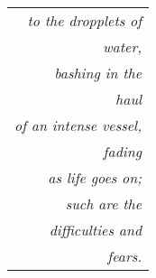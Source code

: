 
\cleardoublepage


\thispagestyle{empty}
\begin{flushright}

\begin{minipage}{9cm}
\vspace{2.5cm}
\hfill%
\begin{tabular}[t]{r}
\emph{to the dropplets of}\\
\emph{water,}\\
\emph{bashing in the}\\
\emph{haul}\\
\emph{of an intense vessel,}\\
\emph{fading}\\
\emph{as life goes on;}\\
\emph{such are the}\\
\emph{difficulties and}\\
\emph{fears.}\\
\end{tabular}

\end{minipage}
\end{flushright}
\cleardoublepage


